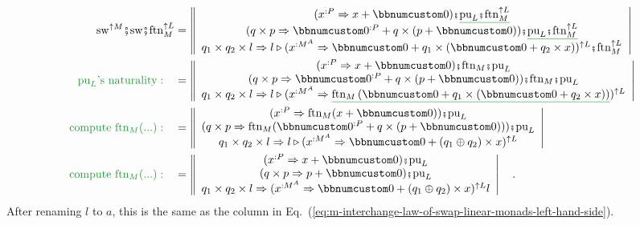 \begin{align*}
\text{sw}^{\uparrow M}\bef\text{sw}\bef\text{ftn}_{M}^{\uparrow L} & =\left\Vert \begin{array}{c}
(x^{:P}\Rightarrow x+\bbnum 0)\bef\gunderline{\text{pu}_{L}\bef\text{ftn}_{M}^{\uparrow L}}\\
(q\times p\Rightarrow\bbnum 0^{:P}+q\times\left(p+\bbnum 0\right))\bef\gunderline{\text{pu}_{L}\bef\text{ftn}_{M}^{\uparrow L}}\\
q_{1}\times q_{2}\times l\Rightarrow l\triangleright(x^{:M^{A}}\Rightarrow\bbnum 0+q_{1}\times(\bbnum 0+q_{2}\times x))^{\uparrow L}\bef\text{ftn}_{M}^{\uparrow L}
\end{array}\right|\\
{\color{greenunder}\text{pu}_{L}\text{'s naturality}:}\quad & =\left\Vert \begin{array}{c}
(x^{:P}\Rightarrow x+\bbnum 0)\bef\text{ftn}_{M}\bef\text{pu}_{L}\\
(q\times p\Rightarrow\bbnum 0^{:P}+q\times\left(p+\bbnum 0\right))\bef\text{ftn}_{M}\bef\text{pu}_{L}\\
q_{1}\times q_{2}\times l\Rightarrow l\triangleright(x^{:M^{A}}\Rightarrow\gunderline{\text{ftn}_{M}\left(\bbnum 0+q_{1}\times(\bbnum 0+q_{2}\times x)\right)})^{\uparrow L}
\end{array}\right|\\
{\color{greenunder}\text{compute }\text{ftn}_{M}(...):}\quad & =\left\Vert \begin{array}{c}
(x^{:P}\Rightarrow\text{ftn}_{M}(x+\bbnum 0))\bef\text{pu}_{L}\\
(q\times p\Rightarrow\text{ftn}_{M}(\bbnum 0^{:P}+q\times\left(p+\bbnum 0\right)))\bef\text{pu}_{L}\\
q_{1}\times q_{2}\times l\Rightarrow l\triangleright(x^{:M^{A}}\Rightarrow\bbnum 0+\left(q_{1}\oplus q_{2}\right)\times x)^{\uparrow L}
\end{array}\right|\\
{\color{greenunder}\text{compute }\text{ftn}_{M}(...):}\quad & =\left\Vert \begin{array}{c}
(x^{:P}\Rightarrow x+\bbnum 0)\bef\text{pu}_{L}\\
(q\times p\Rightarrow p+\bbnum 0)\bef\text{pu}_{L}\\
q_{1}\times q_{2}\times l\Rightarrow(x^{:M^{A}}\Rightarrow\bbnum 0+\left(q_{1}\oplus q_{2}\right)\times x)^{\uparrow L}l
\end{array}\right|\quad.
\end{align*}
After renaming $l$ to $a$, this is the same as the column in Eq.~(\ref{eq:m-interchange-law-of-swap-linear-monads-left-hand-side}).

